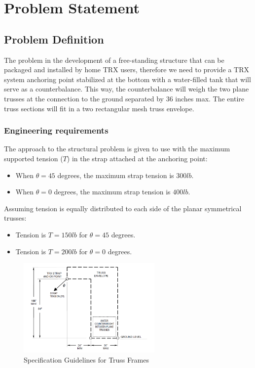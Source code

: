 \chapter{Problem Statement}
\section{Problem Definition}
The problem in the development of a free-standing structure that can be packaged and installed by home TRX users, therefore we need to provide a TRX system anchoring point stabilized at the bottom with a water-filled tank that will serve as a counterbalance. This way, the counterbalance will weigh the two plane trusses at the connection to the ground separated by $36$ inches max. The entire truss sections will fit in a two rectangular mesh truss envelope.
\subsection{Engineering requirements}
The approach to the structural problem is given to use with the maximum supported tension ($T$) in the strap attached at the anchoring point:
\begin{itemize}
\item When $ \theta = 45$ degrees, the maximum strap tension is $300 lb$.
\item When $ \theta = 0$ degrees, the maximum strap tension is $400 lb$.
\end{itemize}
Assuming tension is equally distributed to each side of the planar symmetrical trusses:
\begin{itemize}
\item Tension is $T = 150 lb$ for $ \theta = 45$ degrees.
\item Tension is $T = 200 lb$ for $ \theta = 0$ degrees.
\end{itemize}
\begin{figure}
    \centering
    \includegraphics[width=7cm]{pr1.png}
    \caption{Specification Guidelines for Truss Frames}
\end{figure}
